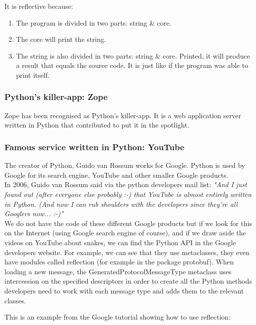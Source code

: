 It is reflective because:
\begin{enumerate}
    \item The program is divided in two parts: string \& core.
    \item The core will print the string.
    \item The string is also divided in two parts: string \& core. Printed, it will produce a result that equals the source code. It is just like if the program was able to print itself. 
\end{enumerate}

\subsubsection{Python's killer-app: Zope}
Zope has been recognised as Python's killer-app. It is a web application server written in Python that contributed to put it in the spotlight.

\subsubsection{Famous service written in Python: YouTube}
The creator of Python, Guido van Rossum works for Google. Python is used by Google for its search engine, YouTube and other smaller Google products.\\

In 2006, Guido van Rossum said via the python developers mail list:
\emph{"And I just found out (after everyone else probably :-) that YouTube is almost entirely written in Python. (And now I can rub shoulders with the developers since they're all Googlers now... :-)"}\\

We do not have the code of these different Google products but if we look for this on the Internet (using Google search engine of course), and if we draw aside the videos on YouTube about snakes, we can find the Python API in the Google developers website. For example, we can see that they use metaclasses, they even have modules called reflection (for example in the package protobuf). When loading a new message, the GeneratedProtocolMessageType metaclass uses intercession on the specified descriptors in order to create all the Python methods developers need to work with each message type and adds them to the relevant classes. \cite{google_reflection_references, google_reflection_tutorial}

This is an example from the Google tutorial showing how to use reflection:



